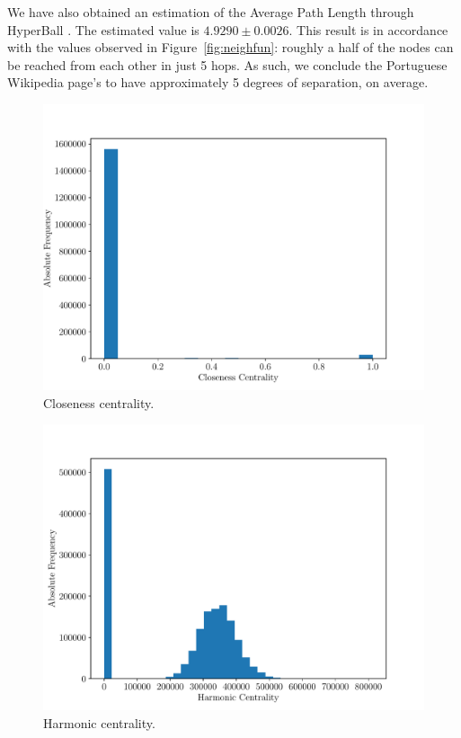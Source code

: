 \documentclass[9pt,a4paper,twocolumn]{article}
\begin{document}
We have also obtained an estimation of the Average Path Length through HyperBall \cite{DBLP:conf/icdm/BoldiV13}. The estimated value is $ 4.9290 \pm 0.0026 $. This result is in accordance with the values observed in Figure~\ref{fig:neighfun}: roughly a half of the nodes can be reached from each other in just 5 hops. As such, we conclude the Portuguese Wikipedia page's to have approximately 5 degrees of separation, on average.

\begin{figure}[h]
	\centering
	\includegraphics[width=\linewidth]{wikipedia_pt_closeness_centrality.pdf}
	\caption{Closeness centrality.}
	\label{fig:closeness}
\end{figure}

\begin{figure}[h]
	\centering
	\includegraphics[width=\linewidth]{wikipedia_pt_harmonic_centrality.pdf}
	\caption{Harmonic centrality.}
	\label{fig:harmonic}
\end{figure}
\end{document}
